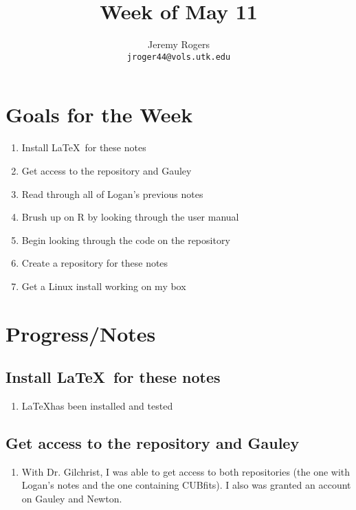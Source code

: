 \documentclass[12 pt]{article}
\title{Week of May 11}
\author{Jeremy Rogers \\
	\texttt{jroger44@vols.utk.edu}}
\begin{document}
	\maketitle
	
	\tableofcontents
	
	\section{Goals for the Week}
	\begin{enumerate}
		\item Install \LaTeX\ for these notes
		\item Get access to the repository and Gauley
		\item Read through all of Logan's previous notes
		\item Brush up on R by looking through the user manual
		\item Begin looking through the code on the repository
		\item Create a repository for these notes
		\item Get a Linux install working on my box
	\end{enumerate}
	
	\section{Progress/Notes}
	
	\subsection{Install \LaTeX\ for these notes}
		\begin{enumerate}
			\item \LaTeX has been installed and tested
		\end{enumerate}
	
	\subsection{Get access to the repository and Gauley}
		 \begin{enumerate}
		 	\item With Dr. Gilchrist, I was able to get access to both repositories (the one with Logan's notes and the one containing CUBfits). I also was granted an account on Gauley and Newton.
		 \end{enumerate}
\end{document}
